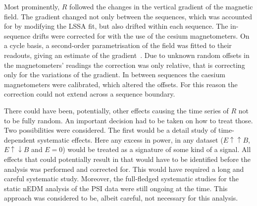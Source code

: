 Most prominently, $R$ followed the changes in the vertical gradient of the magnetic field. The gradient changed not only between the sequences, which was accounted for by modifying the LSSA fit, but also drifted within each sequence.
The in-sequence drifts were corrected for with the use of the cesium magnetometers. On a cycle basis, a second-order parametrisation of the field was fitted to their readouts, giving an estimate of the gradient~\cite{Afach2014magmoment,WurstenThesis}. Due to unknown random offsets in the magnetometers' readings the correction was only relative, that is correcting only for the variations of the gradient. In between sequences the caesium magnetometers were calibrated, which altered the offsets. For this reason the correction could not extend across a sequence boundary.

There could have been, potentially, other effects causing the time series of $R$ not to be fully random. An important decision had to be taken on how to treat those. Two possibilities were considered. The first would be a detail study of time-dependent systematic effects.
Here any excess in power, in any dataset ($E \uparrow \uparrow B$, $E \uparrow \downarrow B$ and $E=0$) would be treated as a signature of some kind of a signal. All effects that could potentially result in that would have to be identified before the analysis was performed and corrected for. This would have required a long and careful systematic study. Moreover, the full-fledged systematic studies for the static nEDM analysis of the PSI data were still ongoing at the time. This approach was considered to be, albeit careful, not necessary for this analysis.



